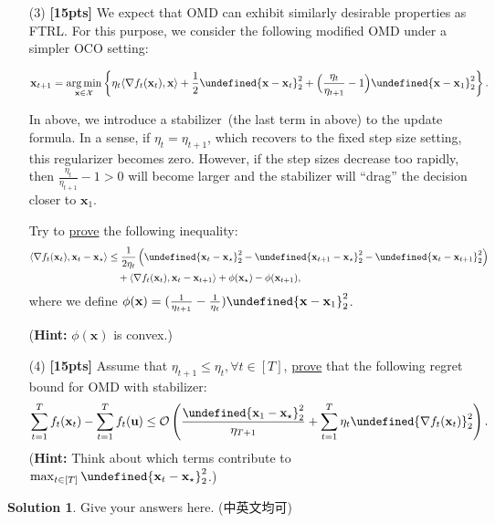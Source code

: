 \documentclass[a4paper]{article}
\numberwithin{equation}{section}
\theoremstyle{definition}
\newtheorem*{solution}{Solution}
\newcommand\inner[2]{\langle #1, #2 \rangle}
\DeclareMathOperator*{\argmin}{arg\,min}
\theoremstyle{definition}
\def \X {\mathcal{X}}
\def \O {\mathcal{O}}
\def \u {\textbf{u}}
\def \x {\textbf{x}}
\def \xs {\x_\star}
\let\norm\undefined
\DeclarePairedDelimiter\norm{\lVert}{\rVert}
\begin{document}
\begin{enumerate}
  \item[(3)] \textbf{[15pts]} We expect that OMD can exhibit similarly desirable properties as FTRL. For this purpose, we consider the following modified OMD under a simpler OCO setting:
  \begin{tcolorbox}[top=-6pt]
    \begin{align*}
      \x_{t+1} = \argmin_{\x \in \X} \left\{\eta_t \inner{\nabla f_t(\x_t)}{\x} + \frac{1}{2}\norm{\x - \x_t}_2^2 + \Big(\frac{\eta_t}{\eta_{t+1}} - 1\Big)\norm{\x - \x_1}_2^2 \right\}.
    \end{align*}
  \end{tcolorbox}
  In above, we introduce a stabilizer~(the last term in above) to the update formula. In a sense, if $\eta_t = \eta_{t+1}$, which recovers to the fixed step size setting, this regularizer becomes zero. However, if the step sizes decrease too rapidly, then $\frac{\eta_t}{\eta_{t+1}} - 1 > 0$ will become larger and the stabilizer will ``drag'' the decision closer to $\x_1$. 

  Try to \underline{prove} the following inequality:
  \begin{align*}
    \inner{\nabla f_t(\x_t)}{\x_t - \xs}&\leq \frac{1}{2\eta_t}\left(\norm{\x_t- \xs}_2^2 -\norm{\x_{t+1}- \xs}_2^2 -  \norm{\x_t- \x_{t+1}}_2^2\right) \\
    &\quad + \inner{\nabla f_t(\x_t)}{\x_t - \x_{t+1}} + \phi(\xs)-\phi(\x_{t+1}),
  \end{align*}
  where we define $\phi(\x) = (\frac{1}{\eta_{t+1}} - \frac{1}{\eta_t})\norm{\x - \x_1}^2_2$.

  (\textbf{Hint:} $\phi(\x)$ is convex.)
  \item[(4)] \textbf{[15pts]} Assume that $\eta_{t+1} \leq \eta_{t}, \forall t\in[T]$, \underline{prove} that the following regret bound for OMD with stabilizer:
  \begin{align*}
          \sum_{t=1}^T f_t(\x_t)-\sum_{t=1}^T f_t(\u) \leq \O\left(\frac{\norm{\x_1 - \xs}_2^2}{\eta_{T+1}} + \sum_{t=1}^T \eta_{t}\norm{\nabla f_t(\x_t)}_2^2 \right).
  \end{align*}
  (\textbf{Hint:} Think about which terms contribute to $\max_{t \in [T]}\norm{\x_t-\xs}_2^2$.)
\end{enumerate}

\begin{solution}
Give your answers here. (中英文均可)
~\\
~\\
~\\
\end{solution}
\end{document}
